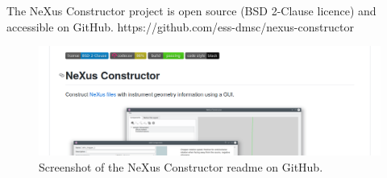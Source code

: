 The NeXus Constructor project is open source (BSD 2-Clause licence) and accessible on GitHub.
https://github.com/ess-dmsc/nexus-constructor

\begin{figure}
\includegraphics[width=\linewidth]{github.png}
\caption{Screenshot of the NeXus Constructor readme on GitHub.}
\end{figure}
